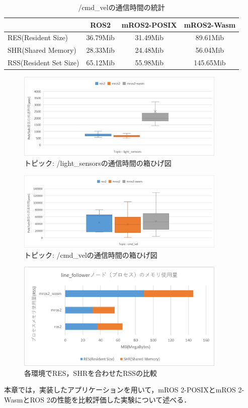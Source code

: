 \begin{table}[ht]
  \centering
  \begin{tabular}{|l|c|c|c|}
  \hline
   & ROS2 & mROS2-POSIX & mROS2-Wasm \\ \hline
  RES(Resident Size) & 36.79Mib & 31.49Mib & 89.61Mib \\ \hline
  SHR(Shared Memory) & 28.33Mib & 24.48Mib & 56.04Mib \\ \hline
  RSS(Resident Set Size) & 65.12Mib & 55.98Mib & 145.65Mib \\ \hline
  \end{tabular}
  \caption{/cmd\_velの通信時間の統計}
  \label{tab:sensor_stats}
\end{table}

\begin{figure}[ht]
  \centering
  \includegraphics[width=10cm]{images/fig6_lightsensors.png}
  \caption{トピック: /light\_sensorsの通信時間の箱ひげ図}
  \label{fig:light_sensors}
\end{figure}
\begin{figure}[ht]
  \centering
  \includegraphics[width=10cm]{images/fig6_cmdvel.png}
  \caption{トピック: /cmd\_velの通信時間の箱ひげ図}
  \label{fig:cmd_vel}
\end{figure}
\begin{figure}[ht]
  \centering
  \includegraphics[width=10cm]{images/fig6_memory.png}
  \caption{各環境でRES，SHRを合わせたRSSの比較}
  \label{fig:allmemory}
\end{figure}
本章では，実装したアプリケーションを用いて，mROS 2-POSIXとmROS 2-WasmとROS 2の性能を比較評価した実験について述べる．
